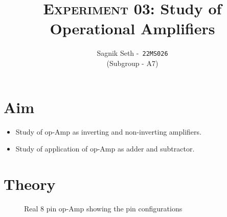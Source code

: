 \documentclass{scrartcl}
\title{
        \Large\textsc{Experiment 03: }
        \huge\textbf{Study of Operational Amplifiers} \\
}
\author{{\Large Sagnik Seth} -\   \texttt{22MS026}\\ ({\small Subgroup - A7}) }
\date{}
\begin{document}
\maketitle
\section{Aim}
\begin{itemize}
    \item Study of op-Amp as inverting and non-inverting amplifiers.
    \item Study of application of op-Amp as adder and subtractor.
\end{itemize}
\section{Theory}
\begin{figure}[H]
    \centering
    
    \caption{Real 8 pin op-Amp showing the pin configurations}
\end{figure}




\end{document}

